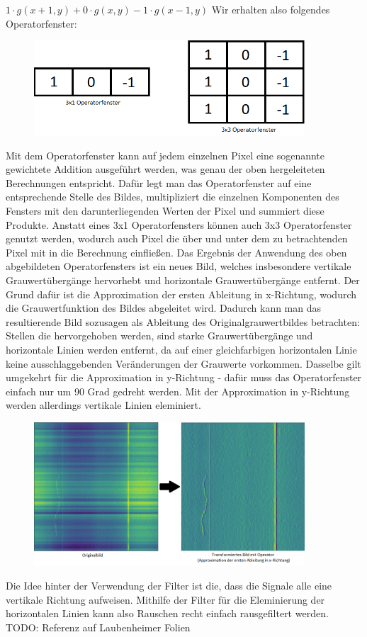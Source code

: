 \documentclass[11pt, a4paper]{article}
\begin{document}
$1\cdot g(x+1,y)+0\cdot g(x,y)-1\cdot g(x-1,y)$
\newline
Wir erhalten also folgendes Operatorfenster:
\begin{figure}[h]
\centering
\includegraphics[width=0.9\textwidth]{img/operatorfenster.png}
\end{figure}
\newline
Mit dem Operatorfenster kann auf jedem einzelnen Pixel eine sogenannte gewichtete Addition ausgeführt werden, was genau der oben hergeleiteten Berechnungen entspricht. Dafür legt man das Operatorfenster auf eine entsprechende Stelle des Bildes, multipliziert die einzelnen Komponenten des Fensters mit den darunterliegenden Werten der Pixel und summiert diese Produkte. Anstatt eines 3x1 Operatorfensters können auch 3x3 Operatorfenster genutzt werden, wodurch auch Pixel die über und unter dem zu betrachtenden Pixel mit in die Berechnung einfließen. Das Ergebnis der Anwendung des oben abgebildeten Operatorfensters ist ein neues Bild, welches insbesondere vertikale Grauwertübergänge hervorhebt und horizontale Grauwertübergänge entfernt. Der Grund dafür ist die Approximation der ersten Ableitung in x-Richtung, wodurch die Grauwertfunktion des Bildes abgeleitet wird. Dadurch kann man das resultierende Bild sozusagen als Ableitung des Originalgrauwertbildes betrachten: Stellen die hervorgehoben werden, sind starke Grauwertübergänge und horizontale Linien werden entfernt, da auf einer gleichfarbigen horizontalen Linie keine ausschlaggebenden Veränderungen der Grauwerte vorkommen. Dasselbe gilt umgekehrt für die Approximation in y-Richtung - dafür muss das Operatorfenster einfach nur um 90 Grad gedreht werden. Mit der Approximation in y-Richtung werden allerdings vertikale Linien eleminiert.
\begin{figure}[h]
\centering
\includegraphics[width=0.9\textwidth]{img/original-vs-cv.png}
\end{figure}
\newline
Die Idee hinter der Verwendung der Filter ist die, dass die Signale alle eine vertikale Richtung aufweisen. Mithilfe der Filter für die Eleminierung der horizontalen Linien kann also Rauschen recht einfach rausgefiltert werden.
TODO: Referenz auf Laubenheimer Folien
\end{document}
